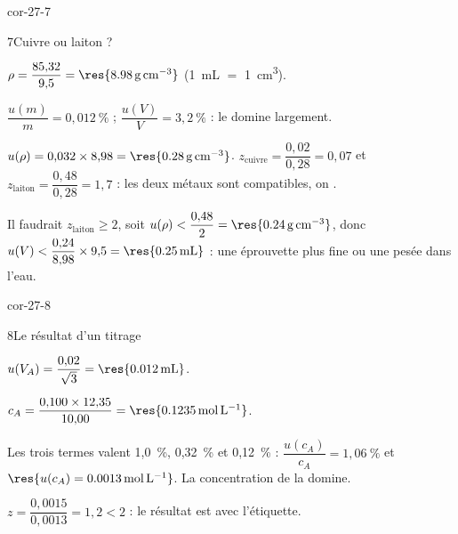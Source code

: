\begin{blocLivre}{cor-27-7}
\begin{corrige}{7}{Cuivre ou laiton ?}
\begin{questions}
\item $\rho=\dfrac{85{,}32}{9{,}5}=\res{\qty{8,98}{g.cm^{-3}}}$ (\qty{1}{mL} $=$ \qty{1}{cm^3}).
\item $\dfrac{u(m)}{m}=0{,}012~\%$ ; $\dfrac{u(V)}{V}=3{,}2~\%$ : le  domine largement.
\item $u(\rho)=0{,}032\times8{,}98=\res{\qty{0,28}{g.cm^{-3}}}$. $z_\text{cuivre}=\dfrac{0{,}02}{0{,}28}=0{,}07$ et $z_\text{laiton}=\dfrac{0{,}48}{0{,}28}=1{,}7$ : les deux
métaux sont compatibles, on .
\item Il faudrait $z_\text{laiton}\geqslant2$, soit $u(\rho)<\dfrac{0{,}48}{2}=\res{\qty{0,24}{g.cm^{-3}}}$, donc
$u(V)<\dfrac{0{,}24}{8{,}98}\times9{,}5=\res{\qty{0,25}{mL}}$ : une éprouvette plus fine ou une pesée dans l'eau.
\end{questions}
\end{corrige}
\end{blocLivre}
\begin{blocLivre}{cor-27-8}
\begin{corrige}{8}{Le résultat d'un titrage}
\begin{questions}
\item $u(V_A)=\dfrac{0{,}02}{\sqrt3}=\res{\qty{0,012}{mL}}$.
\item $c_A=\dfrac{0{,}100\times12{,}35}{10{,}00}=\res{\qty{0,1235}{mol.L^{-1}}}$.
\item Les trois termes valent 1,0~\%, 0,32~\% et 0,12~\% : $\dfrac{u(c_A)}{c_A}=1{,}06~\%$ et $\res{u(c_A)=\qty{0,0013}{mol.L^{-1}}}$.
La concentration de la  domine.
\item $z=\dfrac{0{,}0015}{0{,}0013}=1{,}2<2$ : le résultat est  avec l'étiquette.
\end{questions}
\end{corrige}
\end{blocLivre}
